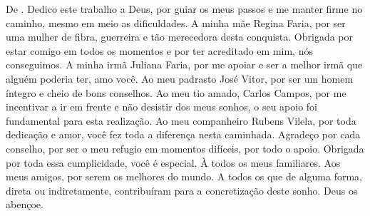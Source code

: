 \begin{dedicatoria}
\vspace*{\fill}
\vspace*{\fill}
\vspace*{\fill}
\vspace*{\fill}
\vspace*{\fill}
\vspace*{\fill}
De \imprimirAutorUm.
\newline
Dedico este trabalho a Deus, por guiar os meus passos e me manter firme no caminho, mesmo em meio as dificuldades. A minha mãe Regina Faria, por ser uma mulher de fibra, guerreira e tão merecedora desta conquista. Obrigada por estar comigo em todos os momentos e por ter acreditado em mim, nós conseguimos. A minha irmã Juliana Faria, por me apoiar e ser a melhor irmã que alguém poderia ter, amo você. Ao meu padrasto José Vitor, por ser um homem íntegro e cheio de bons conselhos. Ao meu tio amado, Carlos Campos, por me incentivar a ir em frente e não desistir dos meus sonhos, o seu apoio foi fundamental para esta realização. Ao meu companheiro Rubens Vilela, por toda dedicação e amor, você fez toda a diferença nesta caminhada. Agradeço por cada conselho, por ser o meu refugio em momentos difíceis, por todo o apoio. Obrigada por toda essa cumplicidade, você é especial. À todos os meus familiares. Aos meus amigos, por serem os melhores do mundo. A todos os que de alguma forma, direta ou indiretamente, contribuíram para a concretização deste sonho. Deus os abençoe.


\end{dedicatoria}
